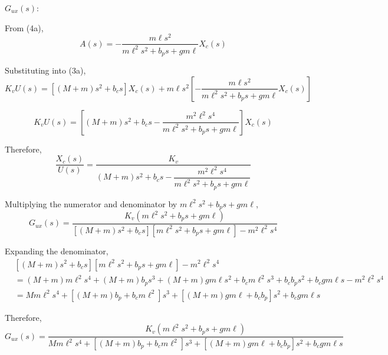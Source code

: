 \documentclass[11pt,a4paper]{article}
\begin{document}
$G_{ux}(s)$:

From (4a), 
\begin{equation*}
    A(s) = -\frac{m \ell s^{2}}{m \ell^{2} s^{2} + b_{p} s + g m \ell} X_{c}(s)
\end{equation*}

Substituting into (3a),
\begin{equation*}
    K_{v} U(s) = \left[ \left( M + m \right) s^{2} + b_{c} s \right] X_{c}(s)
    + m \ell s^{2} \left[ -\frac{m \ell s^{2}}{m \ell^{2} s^{2} + b_{p} s 
	+ g m \ell} X_{c}(s) \right]
\end{equation*}

\begin{equation*}
    K_{v} U(s) = \left[ \left( M + m \right) s^{2} + b_{c} s 
	- \frac{m^{2} \ell^{2} s^{4}}{m \ell^{2} s^{2} + b_{p} s + g m \ell}
    \right] X_{c}(s)
\end{equation*}

Therefore,
\begin{equation*}
    \frac{X_{c}(s)}{U(s)} = \frac{K_{v}}{\left( M + m \right) s^{2} + b_{c} s
    - \dfrac{m^{2} \ell^{2} s^{4}}{m \ell^{2} s^{2} + b_{p} s + g m \ell}}
\end{equation*}

Multiplying the numerator and denominator by $m\ell^{2}s^{2}+b_{p}s+gm\ell$,
\begin{equation*}
    G_{ux}(s) = \frac{K_{v} \left( m \ell^{2} s^{2} + b_{p} s + g m \ell\right)}
    {\left[ \left( M + m \right) s^{2} + b_{c} s \right] 
	\left[ m \ell^{2} s^{2} + b_{p} s + g m \ell \right] - m^{2} \ell^{2} s^{4}}
\end{equation*}

Expanding the denominator,
\begin{align*}
	&\left[ \left( M + m \right) s^{2} + b_{c} s \right]
    \left[ m \ell^{2} s^{2} + b_{p} s + g m \ell \right]
    -m^{2}\ell^{2}s^{4} \\  
    &= \left( M + m \right) m \ell^{2} s^{4}
    + \left( M + m \right) b_{p} s^{3}
    + \left( M + m \right) g m \ell s^{2} 
    + b_{c} m \ell^{2} s^{3} + b_{c} b_{p} s^{2} + b_{c} g m \ell s
    - m^{2} \ell^{2} s^{4} \\
	&= M m \ell^{2} s^{4} + \left[ \left( M + m \right) b_{p} + b_{c} m \ell^{2} 
	\right] s^{3} + \left[ \left( M + m \right) gm \ell + b_{c} b_{p} \right] 
	s^{2} + b_{c} g m \ell s
\end{align*}
	
Therefore,
\begin{equation}
    G_{ux}(s) = \frac{K_{v} \left( m \ell^{2} s^{2} + b_{p} s + g m \ell \right)}
    {M m \ell^{2} s^{4} + \left[ \left( M + m \right) b_{p} + b_{c} m \ell^{2} 
	\right] s^{3} + \left[ \left( M + m \right) g m \ell + b_{c} b_{p} \right]
	s^{2} + b_{c} g m \ell s} \tag{5}
\end{equation}
\end{document}
